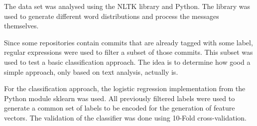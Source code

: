 The data set was analysed using the NLTK library \cite{nltk} and Python.
The library was used to generate different word distributions and process
the messages themselves.

Since some repositories contain commits that are already tagged with some label,
regular expressions were used to filter a subset of those commits.
This subset was used to test a basic classification approach. The idea is to
determine how good a simple approach, only based on text analysis, actually is.

For the classification approach, the logistic regression implementation from
the Python module sklearn \cite{sklearn} was used. All previously filtered
labels were used to generate a common set of labels to be encoded for the
generation of feature vectors. The validation of the classifier was done using
10-Fold cross-validation.
